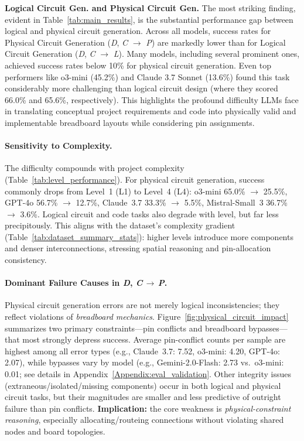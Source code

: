 \documentclass{article} %
\begin{document}
\textbf{Logical Circuit Gen. and Physical Circuit Gen.} \:
The most striking finding, evident in Table~\ref{tab:main_results}, is the substantial performance gap between logical and physical circuit generation.
Across all models, success rates for Physical Circuit Generation (\textit{D}, \textit{C} $\rightarrow$ \textit{P}) are markedly lower than for Logical Circuit Generation (\textit{D}, \textit{C} $\rightarrow$ \textit{L}).
Many models, including several prominent ones, achieved success rates below 10\% for physical circuit generation. Even top performers like o3-mini (45.2\%) and Claude 3.7 Sonnet (13.6\%) found this task considerably more challenging than logical circuit design (where they scored 66.0\% and 65.6\%, respectively).
This highlights the profound difficulty LLMs face in translating conceptual project requirements and code into physically valid and implementable breadboard layouts while considering pin assignments.





\paragraph{Sensitivity to Complexity.}
The difficulty compounds with project complexity (Table~\ref{tab:level_performance}). 
For physical circuit generation, success commonly drops from Level~1 (L1) to Level~4 (L4): 
o3-mini 65.0\% $\rightarrow$ 25.5\%, GPT-4o 56.7\% $\rightarrow$ 12.7\%, Claude~3.7 33.3\% $\rightarrow$ 5.5\%, Mistral-Small~3 36.7\% $\rightarrow$ 3.6\%. 
Logical circuit and code tasks also degrade with level, but far less precipitously. 
This aligns with the dataset’s complexity gradient (Table~\ref{tab:dataset_summary_stats}): higher levels introduce more components and denser interconnections, stressing spatial reasoning and pin-allocation consistency.


\paragraph{Dominant Failure Causes in \textit{D}, \textit{C}\,$\rightarrow$\,\textit{P}.}
Physical circuit generation errors are not merely logical inconsistencies; they reflect violations of \emph{breadboard mechanics}. 
Figure~\ref{fig:physical_circuit_impact} summarizes two primary constraints—pin conflicts and breadboard bypasses—that most strongly depress success. 
Average pin-conflict counts per sample are highest among all error types (e.g., Claude~3.7: 7.52, o3-mini: 4.20, GPT-4o: 2.07), while bypasses vary by model (e.g., Gemini-2.0-Flash: 2.73 vs.\ o3-mini: 0.01; see details in Appendix~\ref{Appendix:eval_validation}.
Other integrity issues (extraneous/isolated/missing components) occur in both logical and physical circuit tasks, but their magnitudes are smaller and less predictive of outright failure than pin conflicts. 
\textbf{Implication:} the core weakness is \emph{physical-constraint reasoning}, especially allocating/routeing connections without violating shared nodes and board topologies.
\end{document}
